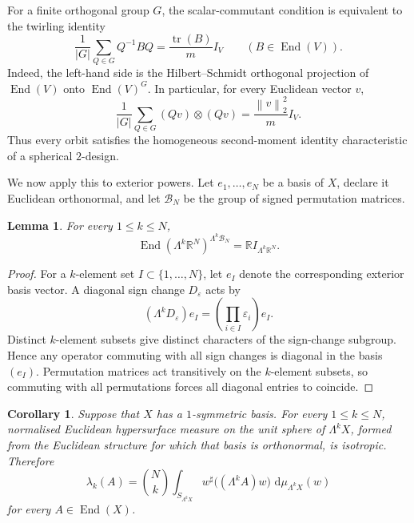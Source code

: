 \documentclass[11pt,a4paper]{amsart}
\numberwithin{equation}{section}
\theoremstyle{plain}
\newtheorem{lemma}[theorem]{Lemma}
\newtheorem{corollary}[theorem]{Corollary}
\theoremstyle{definition}
\theoremstyle{remark}
\DeclareMathOperator{\End}{End}
\DeclareMathOperator{\tr}{tr}
\newcommand{\R}{\mathbb{R}}
\newcommand{\dd}{\,\mathrm{d}}
\newcommand{\Id}{I}
\newcommand{\norm}[1]{\left\|#1\right\|}
\begin{document}
For a finite orthogonal group $G$, the scalar-commutant condition is equivalent to the twirling identity
\begin{equation}\label{eq:twirl}
\frac1{|G|}\sum_{Q\in G}Q^{-1}BQ
=\frac{\tr(B)}m\Id_V
\qquad(B\in\End(V)).
\end{equation}
Indeed, the left-hand side is the Hilbert--Schmidt orthogonal projection of $\End(V)$ onto $\End(V)^G$. In particular, for every Euclidean vector $v$,
\begin{equation}\label{eq:orbit-second-moment}
\frac1{|G|}\sum_{Q\in G}(Qv)\otimes(Qv)
=\frac{\norm{v}_2^2}{m}\Id_V.
\end{equation}
Thus every orbit satisfies the homogeneous second-moment identity characteristic of a spherical $2$-design.

We now apply this to exterior powers. Let $e_1,\ldots,e_N$ be a basis of $X$, declare it Euclidean orthonormal, and let $\mathcal B_N$ be the group of signed permutation matrices.

\begin{lemma}\label{lem:hyperoctahedral}
For every $1\leqslant k\leqslant N$,
\[
\End(\Lambda^k\R^N)^{\Lambda^k\mathcal B_N}
=\R\Id_{\Lambda^k\R^N}.
\]
\end{lemma}

\begin{proof}
For a $k$-element set $I\subset\{1,\ldots,N\}$, let $e_I$ denote the corresponding exterior basis vector. A diagonal sign change $D_\varepsilon$ acts by
\[
(\Lambda^kD_\varepsilon)e_I
=\left(\prod_{i\in I}\varepsilon_i\right)e_I.
\]
Distinct $k$-element subsets give distinct characters of the sign-change subgroup. Hence any operator commuting with all sign changes is diagonal in the basis $(e_I)$. Permutation matrices act transitively on the $k$-element subsets, so commuting with all permutations forces all diagonal entries to coincide.
\end{proof}

\begin{corollary}\label{cor:one-symmetric}
Suppose that $X$ has a $1$-symmetric basis. For every $1\leqslant k\leqslant N$, normalised Euclidean hypersurface measure on the unit sphere of $\Lambda^kX$, formed from the Euclidean structure for which that basis is orthonormal, is isotropic. Therefore
\begin{equation}\label{eq:surface-higher}
\lambda_k(A)
=\binom Nk\int_{S_{\Lambda^kX}}
 w^\sharp\big((\Lambda^kA)w\big)\,\dd\mu_{\Lambda^kX}(w)
\end{equation}
for every $A\in\End(X)$.
\end{corollary}
\end{document}
